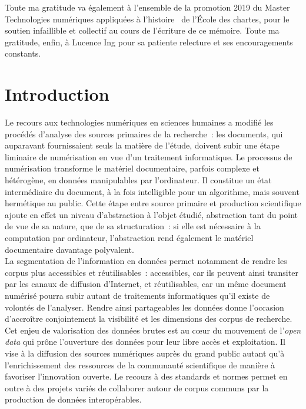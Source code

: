 \documentclass[a4paper,12pt,twoside]{book}
\newcommand{\clearemptydoublepage}{\newpage{\pagestyle{empty}\cleardoublepage}}
\newcommand\mychapter[1]{%
  \chapter*{#1}%
  \markright{\MakeUppercase{#1}}%
}
\newcommand{\eng}{\emph}
\newcommand{\g}[1]{\og#1~\fg}
\begin{document}
	Toute ma gratitude va également à l'ensemble de la promotion 2019 du Master \g{Technologies numériques appliquées à l'histoire} de l'École des chartes, pour le soutien infaillible et collectif au cours de l'écriture de ce mémoire. Toute ma gratitude, enfin, à Lucence Ing pour sa patiente relecture et ses encouragements constants.

\clearemptydoublepage
	
	\printbibliography[keyword={astronomie},title={Histoire de l'astronomie}]
	\printbibliography[keyword={numerique},title={Humanités numériques}]
	\printbibliography[keyword={dataviz},title={Visualisations de données}]
	\printbibliography[keyword={technique},title={Technologies et méthodes}]

\clearemptydoublepage
	
	\mychapter{Introduction}
	
Le recours aux technologies numériques en sciences humaines a modifié les procédés d'analyse des sources primaires de la recherche~: les documents, qui auparavant fournissaient seuls la matière de l'étude, doivent subir une étape liminaire de numérisation en vue d'un traitement informatique. Le processus de numérisation transforme le matériel documentaire, parfois complexe et hétérogène, en données manipulables par l'ordinateur. Il constitue un état intermédiaire du document, à la fois intelligible pour un algorithme, mais souvent hermétique au public. Cette étape entre source primaire et production scientifique ajoute en effet un niveau d'abstraction à l'objet étudié, abstraction tant du point de vue de sa nature, que de sa structuration~: si elle est nécessaire à la computation par ordinateur, l'abstraction rend également le matériel documentaire davantage polyvalent.\\

La segmentation de l'information en données permet notamment de rendre les corpus plus accessibles et réutilisables~: accessibles, car ils peuvent ainsi transiter par les canaux de diffusion d'Internet, et réutilisables, car un même document numérisé pourra subir autant de traitements informatiques qu'il existe de volontés de l'analyser. Rendre ainsi partageables les données donne l'occasion d'accroître conjointement la visibilité et les dimensions des corpus de recherche. Cet enjeu de valorisation des données brutes est au cœur du mouvement de l'\eng{open data} qui prône l'ouverture des données pour leur libre accès et exploitation. Il vise à la diffusion des sources numériques auprès du grand public autant qu'à l'enrichissement des ressources de la communauté scientifique de manière à favoriser l'innovation ouverte. Le recours à des standards et normes permet en outre à des projets variés de collaborer autour de corpus communs par la production de données interopérables.\\
\end{document}
